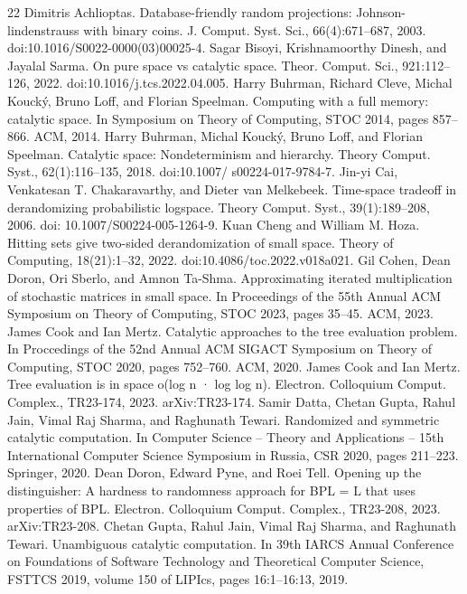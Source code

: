 \documentclass[10pt,a4paper]{article}
\begin{document}
\begin{thebibliography}{22}
 Dimitris Achlioptas. Database-friendly random projections: Johnson-lindenstrauss with binary coins. J. Comput. Syst. Sci., 66(4):671–687, 2003. doi:10.1016/S0022-0000(03)00025-4.
 Sagar Bisoyi, Krishnamoorthy Dinesh, and Jayalal Sarma. On pure space vs catalytic space. Theor. Comput. Sci., 921:112–126, 2022. doi:10.1016/j.tcs.2022.04.005.
 Harry Buhrman, Richard Cleve, Michal Koucký, Bruno Loff, and Florian Speelman. Computing with a full memory: catalytic space. In Symposium on Theory of Computing, STOC 2014, pages 857–866. ACM, 2014.
 Harry Buhrman, Michal Koucký, Bruno Loff, and Florian Speelman. Catalytic space: Nondeterminism and hierarchy. Theory Comput. Syst., 62(1):116–135, 2018. doi:10.1007/ s00224-017-9784-7.
 Jin-yi Cai, Venkatesan T. Chakaravarthy, and Dieter van Melkebeek. Time-space tradeoff in derandomizing probabilistic logspace. Theory Comput. Syst., 39(1):189–208, 2006. doi: 10.1007/S00224-005-1264-9.
 Kuan Cheng and William M. Hoza. Hitting sets give two-sided derandomization of small space. Theory of Computing, 18(21):1–32, 2022. doi:10.4086/toc.2022.v018a021.
 Gil Cohen, Dean Doron, Ori Sberlo, and Amnon Ta-Shma. Approximating iterated multiplication of stochastic matrices in small space. In Proceedings of the 55th Annual ACM Symposium on Theory of Computing, STOC 2023, pages 35–45. ACM, 2023.
 James Cook and Ian Mertz. Catalytic approaches to the tree evaluation problem. In Proccedings of the 52nd Annual ACM SIGACT Symposium on Theory of Computing, STOC 2020, pages 752–760. ACM, 2020.
 James Cook and Ian Mertz. Tree evaluation is in space o(log n · log log n). Electron. Colloquium Comput. Complex., TR23-174, 2023. arXiv:TR23-174.
 Samir Datta, Chetan Gupta, Rahul Jain, Vimal Raj Sharma, and Raghunath Tewari. Randomized and symmetric catalytic computation. In Computer Science – Theory and Applications – 15th International Computer Science Symposium in Russia, CSR 2020, pages 211–223. Springer, 2020.
 Dean Doron, Edward Pyne, and Roei Tell. Opening up the distinguisher: A hardness to randomness approach for BPL = L that uses properties of BPL. Electron. Colloquium Comput. Complex., TR23-208, 2023. arXiv:TR23-208.
 Chetan Gupta, Rahul Jain, Vimal Raj Sharma, and Raghunath Tewari. Unambiguous catalytic computation. In 39th IARCS Annual Conference on Foundations of Software Technology and Theoretical Computer Science, FSTTCS 2019, volume 150 of LIPIcs, pages 16:1–16:13, 2019.

\end{thebibliography}
\end{document}
